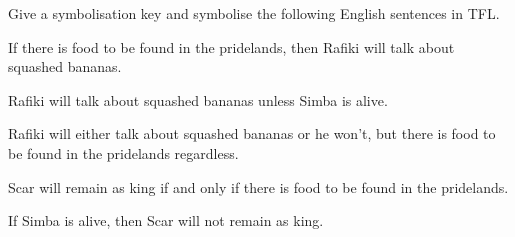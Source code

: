 \problempart Give a symbolisation key and symbolise the following English sentences in TFL.
\begin{earg}
\item If there is food to be found in the pridelands, then Rafiki will talk about squashed bananas.
\item[] 
\item Rafiki will talk about squashed bananas unless Simba is alive.
\item[] 
\item Rafiki will either talk about squashed bananas or he won't, but there is food to be found in the pridelands regardless.
\item[] 
\item Scar will remain as king if and only if there is food to be found in the pridelands.
\item[] 
\item If Simba is alive, then Scar will not remain as king.
\item[] 
\end{earg}


